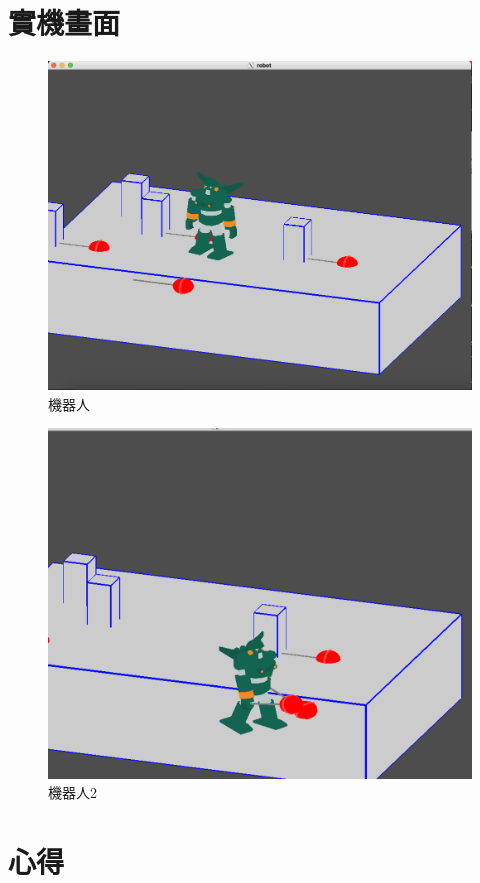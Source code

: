 \documentclass[a4,12pt]{article}
\begin{document}
    \section{實機畫面}
    \begin{figure}[H] 
    \centering
    
    \includegraphics[scale = 0.3]{robot1.png}
    \caption{機器人}
    \end{figure}
    \begin{figure}[H] 
        \centering
       
    \includegraphics[scale = 0.3]{robot2.png}
    \caption{機器人2}
    \end{figure}
    \section{心得}
    
\end{document}

